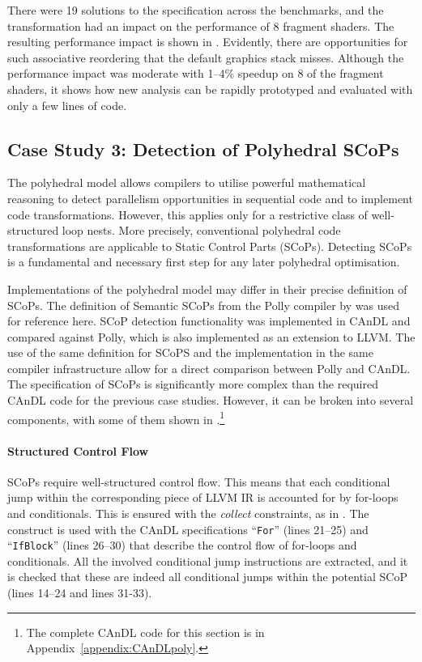     There were 19 solutions to the specification across the benchmarks, and
    the transformation had an impact on the performance of 8 fragment shaders.
    The resulting performance impact is shown in .
    Evidently, there are opportunities for such associative reordering that
    the default graphics stack misses.
    Although the performance impact was moderate with 1--4\% speedup on 8
    of the fragment shaders, it shows how new analysis can be rapidly prototyped
    and evaluated with only a few lines of code.

\subsection{Case Study 3: Detection of Polyhedral SCoPs}

    The polyhedral model
    \citep{Karp:1967:OCU:321406.321418,benabderrahmane2010polyhedral} allows
    compilers to utilise powerful mathematical reasoning to detect parallelism
    opportunities in sequential code and to implement code transformations.
    However, this applies only for a restrictive class of well-structured loop
    nests.
    More precisely, conventional polyhedral code transformations are applicable
    to Static Control Parts (SCoPs).
    Detecting SCoPs is a fundamental and necessary first step for any later
    polyhedral optimisation.

    Implementations of the polyhedral model may differ in their precise
    definition of SCoPs.
    The definition of Semantic SCoPs from the Polly compiler by
    \citet{Lengauer2012Polly} was used for reference here.
    SCoP detection functionality was implemented in CAnDL and compared against
    Polly, which is also implemented as an extension to LLVM.
    The use of the same definition for SCoPS and the implementation in the same
    compiler infrastructure allow for a direct comparison between Polly and
    CAnDL.
    The specification of SCoPs is significantly more complex than the required
    CAnDL code for the previous case studies.
    However, it can be broken into several components, with some of them shown
    in .\footnote{The complete CAnDL code for this section
    is in Appendix~\ref{appendix:CAnDLpoly}.}

    \paragraph*{Structured Control Flow}
    SCoPs require well-structured control flow.
    This means that each conditional jump within the
    corresponding piece of LLVM IR is accounted for by for-loops and
    conditionals.
    This is ensured with the {\it collect} constraints, as in
    .
    The construct is used with the CAnDL specifications ``{\tt For}''
    (lines 21--25) and ``{\tt IfBlock}'' (lines 26--30) that describe the
    control flow of for-loops and conditionals.
    All the involved conditional jump instructions are extracted, and it is
    checked that these are indeed all conditional jumps within the potential
    SCoP (lines 14--24 and lines 31-33).

